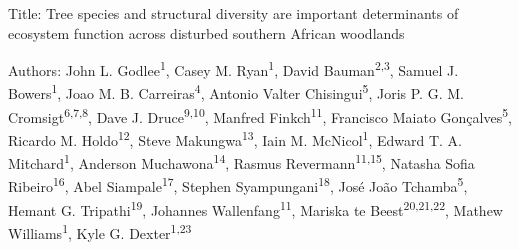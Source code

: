 \documentclass[11pt,a4paper]{article}
\begin{document}
{\LARGE{Title: Tree species and structural diversity are important determinants of ecosystem function across disturbed southern African woodlands}}

\vspace{1cm}

Authors: John L. Godlee\textsuperscript{1}, Casey M. Ryan\textsuperscript{1}, David Bauman\textsuperscript{2,3}, Samuel J. Bowers\textsuperscript{1}, Joao M. B. Carreiras\textsuperscript{4}, Antonio Valter Chisingui\textsuperscript{5}, Joris P. G. M. Cromsigt\textsuperscript{6,7,8}, Dave J. Druce\textsuperscript{9,10}, Manfred Finkch\textsuperscript{11}, Francisco Maiato Gon\c{c}alves\textsuperscript{5}, Ricardo M. Holdo\textsuperscript{12}, Steve Makungwa\textsuperscript{13}, Iain M. McNicol\textsuperscript{1}, Edward T. A. Mitchard\textsuperscript{1}, Anderson Muchawona\textsuperscript{14}, Rasmus Revermann\textsuperscript{11,15}, Natasha Sofia Ribeiro\textsuperscript{16}, Abel Siampale\textsuperscript{17}, Stephen Syampungani\textsuperscript{18}, Jos\'{e} Jo\~{a}o Tchamba\textsuperscript{5}, Hemant G. Tripathi\textsuperscript{19}, Johannes Wallenfang\textsuperscript{11}, Mariska te Beest\textsuperscript{20,21,22}, Mathew Williams\textsuperscript{1}, Kyle G. Dexter\textsuperscript{1,23}
\end{document}
